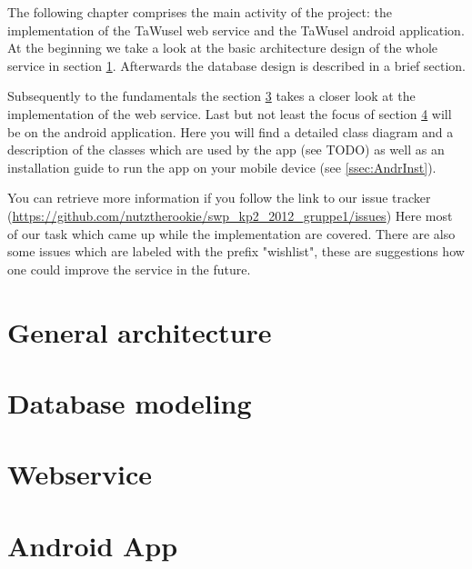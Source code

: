 
The following chapter comprises the main activity of the project: the implementation of the TaWusel web service and the TaWusel android application. At the beginning we take a look at the basic architecture design of the whole service in section \ref{sec:GArc}. Afterwards the database design is described in a brief section.

\emptyRow
Subsequently to the fundamentals the section \ref{sec:Webs} takes a closer look at the implementation of the web service. 
Last but not least the focus of section \ref{sec:Andr} will be on the android application. Here you will find a detailed class diagram and a description of the classes which are used by the app (see TODO) as well as an installation guide to run the app on your mobile device (see \ref{ssec:AndrInst}). 

\emptyRow
You can retrieve more information if you follow the link to our issue tracker (\url{https://github.com/nutztherookie/swp_kp2_2012_gruppe1/issues}) Here most of our task which came up while the implementation are covered. There are also some issues which are labeled with the prefix "wishlist", these are suggestions how one could improve the service in the future.  

\clearpage

\section{General architecture}\label{sec:GArc}


\section{Database modeling}


\section{Webservice}\label{sec:Webs}


\section{Android App}\label{sec:Andr}


